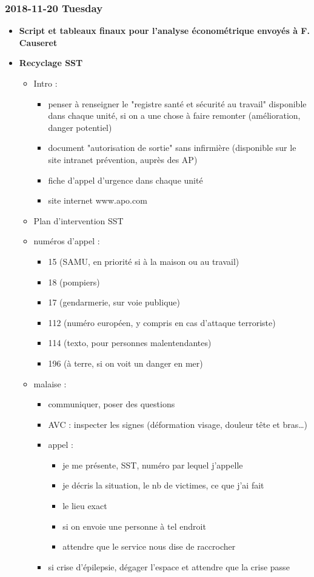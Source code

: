 \documentclass[a4paper]{article}
\begin{document}
\subsubsection*{2018-11-20 Tuesday}
\label{sec:org542b5f4}
\begin{itemize}
\item \textbf{Script et tableaux finaux pour l'analyse économétrique envoyés à F. Causeret}
\label{sec:orgad8bd90}

\item \textbf{Recyclage SST}
\label{sec:orgde0ac84}

\begin{itemize}
\item Intro :
\begin{itemize}
\item penser à renseigner le "registre santé et sécurité au travail" disponible dans chaque unité, si on a une chose à faire remonter (amélioration, danger potentiel)
\item document "autorisation de sortie" sans infirmière (disponible sur le site intranet prévention, auprès des AP)
\item fiche d'appel d'urgence dans chaque unité
\item site internet www.apo.com
\end{itemize}

\item Plan d'intervention SST

\item numéros d'appel :
\begin{itemize}
\item 15 (SAMU, en priorité si à la maison ou au travail)
\item 18 (pompiers)
\item 17 (gendarmerie, sur voie publique)
\item 112 (numéro européen, y compris en cas d'attaque terroriste)
\item 114 (texto, pour personnes malentendantes)
\item 196 (à terre, si on voit un danger en mer)
\end{itemize}

\item malaise :
\begin{itemize}
\item communiquer, poser des questions
\item AVC : inspecter les signes (déformation visage, douleur tête et bras\ldots{})
\item appel :
\begin{itemize}
\item je me présente, SST, numéro par lequel j'appelle
\item je décris la situation, le nb de victimes, ce que j'ai fait
\item le lieu exact
\item si on envoie une personne à tel endroit
\item attendre que le service nous dise de raccrocher
\end{itemize}
\item si crise d'épilepsie, dégager l'espace et attendre que la crise passe
\end{itemize}


\end{itemize}
\end{itemize}
\end{document}
